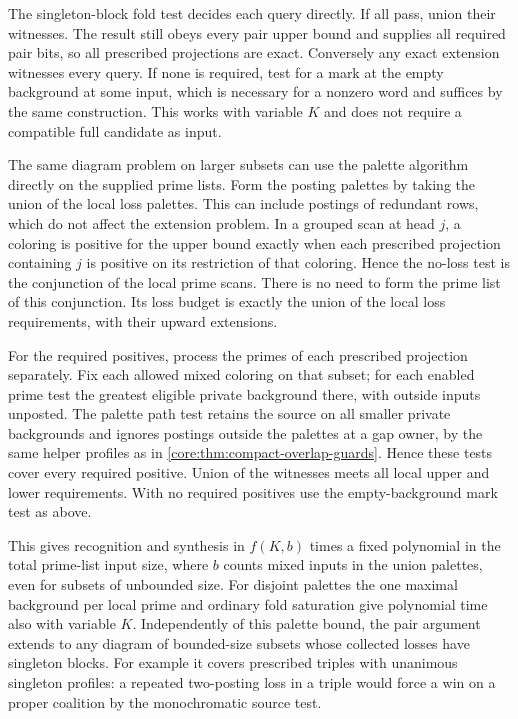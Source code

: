 The singleton-block fold test decides each
query directly. If all pass, union their
witnesses. The result still obeys every
pair upper bound and supplies all required
pair bits, so all prescribed projections are
exact. Conversely any exact extension
witnesses every query. If none is required,
test for a mark at the empty background at
some input, which is necessary for a nonzero
word and suffices by the same construction.
This works with variable $K$ and does not
require a compatible full candidate as input.

The same diagram problem on larger subsets can use
the palette algorithm directly on the supplied
prime lists. Form the posting palettes by taking
the union of the local loss palettes. This can
include postings of redundant rows, which do not
affect the extension problem. In a grouped scan at
head $j$, a coloring is positive for the upper
bound exactly when each prescribed projection
containing $j$ is positive on its restriction of
that coloring. Hence the no-loss test is the
conjunction of the local prime scans. There is
no need to form the prime list of this conjunction.
Its loss budget is exactly the union of the local
loss requirements, with their upward extensions.

For the required positives, process the primes
of each prescribed projection separately. Fix
each allowed mixed coloring on that subset;
for each enabled prime test the greatest eligible
private background there, with outside inputs
unposted. The palette path test retains the
source on all smaller private backgrounds and
ignores postings outside the palettes at a gap
owner, by the same helper profiles as in
\cref{core:thm:compact-overlap-guards}. Hence these
tests cover every required positive. Union of
the witnesses meets all local upper and lower
requirements. With no required positives use
the empty-background mark test as above.

This gives recognition and synthesis in
$f(K,b)$ times a fixed polynomial in the total
prime-list input size, where $b$ counts mixed
inputs in the union palettes, even for subsets
of unbounded size. For disjoint palettes the
one maximal background per local prime and
ordinary fold saturation give polynomial time
also with variable $K$. Independently of this
palette bound, the pair argument extends to
any diagram of bounded-size subsets whose
collected losses have singleton blocks. For
example it covers prescribed triples with
unanimous singleton profiles: a repeated
two-posting loss in a triple would force a
win on a proper coalition by the monochromatic
source test.

